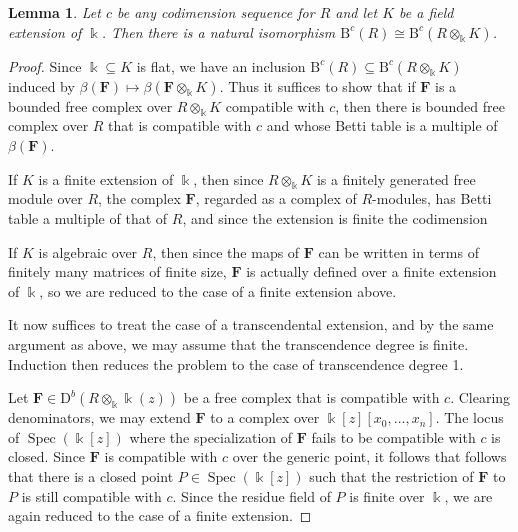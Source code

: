\documentclass[12pt]{amsart}
\newtheorem{lemma}{Lemma}[section]
\theoremstyle{definition}
\theoremstyle{remark}
\newcommand{\Spec}{\operatorname{Spec}}
\newcommand{\kk}{\Bbbk}
\newcommand{\cc}{c}
\newcommand{\FF}{\mathbf{F}}
\newcommand{\DD}{\mathrm{D}}
\newcommand{\BBQ}{\mathrm{B}}
\begin{document}
\begin{lemma}\label{lem:ground field}
Let $\cc$ be any codimension sequence for $R$ and let $K$ be a field extension of $\kk$.  Then there is a natural isomorphism $\BBQ^{\cc}(R)\cong\BBQ^{\cc}(R\otimes_{\kk}K)$.
\end{lemma}
\begin{proof}
Since $\kk\subseteq K$ is flat, we have an inclusion $\BBQ^{\cc}(R)\subseteq\BBQ^{\cc}(R\otimes_{\kk}K)$ induced by $\beta(\FF)\mapsto \beta(\FF\otimes_{\kk} K)$. Thus it suffices to
show that if $\FF$ is a bounded free complex over $R\otimes_{\kk}K$ compatible with $\cc$,
 then there is bounded free complex over $R$ that is compatible with $\cc$ and whose
 Betti table is a multiple of $\beta(\FF)$.
 
If $K$ is a finite extension of $\kk$, then since $R\otimes_{\kk}K$ is a finitely generated 
free module over $R$, the complex $\FF$, regarded as a complex of $R$-modules,
has Betti table a multiple of that of $R$, and since the extension is finite the codimension

If $K$ is algebraic over $R$, then since the maps of $\FF$ can be written in terms of finitely
many matrices of finite size, $\FF$ is actually defined over a finite extension of $\kk$, so we
are reduced to the case of a finite extension above.

It now suffices to treat the case of a transcendental extension, and by the same argument as
above, we may assume that the transcendence degree is finite. Induction then reduces the
problem to the case of transcendence degree 1.



Let $\FF\in \DD^b(R\otimes_{\kk}\kk(z))$ be a free complex that is compatible with $\cc$.  Clearing denominators, we may extend $\FF$ to a complex over $\kk[z][x_0,\dots,x_n]$.  The locus of $\Spec(\kk[z])$ where the specialization of $\FF$ fails to be compatible with $\cc$ is  closed.  Since $\FF$ is compatible with $\cc$ over the generic point, it follows that follows that there is a closed point $P\in \Spec(\kk[z])$ such that the restriction of $\FF$ to $P$ is still compatible with $\cc$.  Since the residue field of $P$ is finite over $\kk$, we are again reduced to the case of a finite extension.\end{proof}
\end{document}
